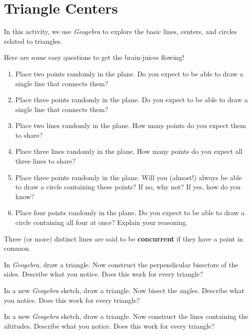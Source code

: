 \newpage
\section{Triangle Centers}

In this activity, we use \textsl{Geogebra} to explore the basic lines, centers, and circles related to triangles.  

\begin{prob} Here are some easy questions to get the brain-juices flowing!
\begin{enumerate} 
\itemsep -3pt
\item Place two points randomly in the plane. Do you expect to be able to
draw a single line that connects them?
\item Place three points randomly in the plane. Do you expect to be able to
draw a single line that connects them?
\item Place two lines randomly in the plane. How many points do you expect
them to share?
\item Place three lines randomly in the plane. How many points do you expect
all three lines to share?
\item Place three points randomly in the plane. Will you (almost!) always be
able to draw a circle containing these points? If no, why not? If yes,
how do you know?
\item Place four points randomly in the plane. Do you expect to be able to
draw a circle containing all four at once? Explain your reasoning.
\end{enumerate}
\end{prob}

\begin{definition}
Three (or more) distinct lines are said to be \textbf{concurrent} if they have a point in common.  
\end{definition}

\begin{prob} 
In \textsl{Geogebra}, draw a triangle. Now construct the perpendicular bisectors of
the sides.  Describe what you notice.  Does this work for every triangle?
\end{prob}

\begin{prob}
In a new \textsl{Geogebra} sketch, draw a triangle. Now bisect the angles.  Describe what you notice.  Does this work for every
triangle?
\end{prob}

\begin{prob}
In a new \textsl{Geogebra} sketch, draw a triangle. Now construct the lines containing the altitudes.  Describe what you notice.  
Does this work for every triangle?
\end{prob}

